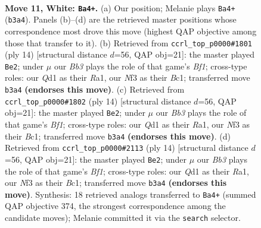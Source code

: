 \documentclass[11pt]{article}
\begin{document}
\clearpage

\begin{figure}[p]\centering
\begin{subfigure}{0.46\textwidth}\centering
\resizebox{\linewidth}{!}{%
\newchessgame
\chessboard[
  setfen={rnbqk2r/pp4b1/1n1p2p1/2p2p1p/3P4/1BN2N2/PPP1KPPP/R1BQ2R1 w kq - 0 11},
  showmover=false,
  pgfstyle=straightmove, color=movearrow, markmove={b3-a4}
]}
\caption{}
\end{subfigure}\hfill
\begin{subfigure}{0.46\textwidth}\centering
\resizebox{\linewidth}{!}{%
\newchessgame
\chessboard[
  setfen={rnbqk2r/pp3pbp/3p1np1/2pP4/4P3/2N2N2/PP3PPP/R1BQKB1R w KQkq - 1 8},
  showmover=false,
  pgfstyle=straightmove, color=movearrow, markmove={f1-e2}
]}
\caption{}
\end{subfigure}
\\[4pt]
\begin{subfigure}{0.46\textwidth}\centering
\resizebox{\linewidth}{!}{%
\newchessgame
\chessboard[
  setfen={rnbqk2r/pp3pbp/3p1np1/2pP4/4P3/2N2N2/PP3PPP/R1BQKB1R w KQkq - 1 8},
  showmover=false,
  pgfstyle=straightmove, color=movearrow, markmove={f1-e2}
]}
\caption{}
\end{subfigure}\hfill
\begin{subfigure}{0.46\textwidth}\centering
\resizebox{\linewidth}{!}{%
\newchessgame
\chessboard[
  setfen={rnbqk2r/pp3pbp/3p1np1/2pP4/4P3/2N2N2/PP3PPP/R1BQKB1R w KQkq - 2 8},
  showmover=false,
  pgfstyle=straightmove, color=movearrow, markmove={f1-e2}
]}
\caption{}
\end{subfigure}
\caption{\textbf{Move 11, White: \texttt{Ba4+}.} (a) Our position; Melanie plays \texttt{Ba4+} (\texttt{b3a4}). Panels (b)--(d) are the retrieved master positions whose correspondence most drove this move (highest QAP objective among those that transfer to it). (b) Retrieved from \texttt{ccrl\_top\_p0000\#1801} (ply 14) [structural distance $d$=56, QAP obj=21]: the master played \texttt{Be2}; under $\mu$ our \emph{Bb3} plays the role of that game's \emph{Bf1}; cross-type roles: our \emph{Q}d1 as their \emph{R}a1, our \emph{N}f3 as their \emph{B}c1; transferred move \texttt{b3a4} \textbf{(endorses this move)}. (c) Retrieved from \texttt{ccrl\_top\_p0000\#1802} (ply 14) [structural distance $d$=56, QAP obj=21]: the master played \texttt{Be2}; under $\mu$ our \emph{Bb3} plays the role of that game's \emph{Bf1}; cross-type roles: our \emph{Q}d1 as their \emph{R}a1, our \emph{N}f3 as their \emph{B}c1; transferred move \texttt{b3a4} \textbf{(endorses this move)}. (d) Retrieved from \texttt{ccrl\_top\_p0000\#2113} (ply 14) [structural distance $d$=56, QAP obj=21]: the master played \texttt{Be2}; under $\mu$ our \emph{Bb3} plays the role of that game's \emph{Bf1}; cross-type roles: our \emph{Q}d1 as their \emph{R}a1, our \emph{N}f3 as their \emph{B}c1; transferred move \texttt{b3a4} \textbf{(endorses this move)}. Synthesis: 18 retrieved analogs transferred to \texttt{Ba4+} (summed QAP objective 374, the strongest correspondence among the candidate moves); Melanie committed it via the \texttt{search} selector.}
\label{fig:thought-m20}
\end{figure}
\end{document}
